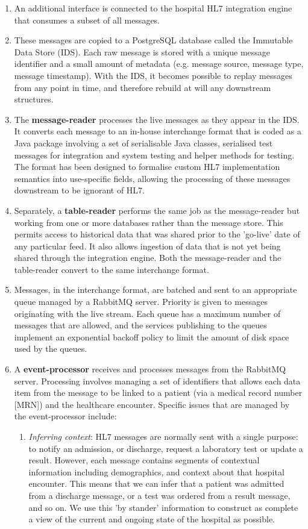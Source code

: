 \documentclass[pmlr,twocolumn,10pt]{jmlr} %
\begin{document}
\begin{enumerate}
    \item An additional interface is connected to the hospital HL7 integration engine that consumes a subset of all messages.
    \item These messages are copied to a PostgreSQL database called the Immutable Data Store (IDS). Each raw message is stored with a unique message identifier and a small amount of metadata (e.g. message source, message type, message timestamp). With the IDS, it becomes possible to replay messages from any point in time, and therefore rebuild at will any downstream structures.
    \item The \textbf{message-reader} processes the live messages as they appear in the IDS. It converts each message to an in-house interchange format that is coded as a Java package involving a set of serialisable Java classes, serialised test messages for integration and system testing and helper methods for testing. The format has been designed to formalise custom HL7 implementation semantics into use-specific fields, allowing the processing of these messages downstream to be ignorant of HL7. 
    \item Separately, a \textbf{table-reader} performs the same job as the message-reader but working from one or more databases rather than the message store. This permits access to historical data that was shared prior to the 'go-live' date of any particular feed. It also allows ingestion of data that is not yet being shared through the integration engine. Both the message-reader and the table-reader convert to the same interchange format.
    \item Messages, in the interchange format, are batched and sent to an appropriate queue managed by a RabbitMQ server. Priority is given to messages originating with the live stream. Each queue has a maximum number of messages that are allowed, and the services publishing to the queues implement an exponential backoff policy to limit the amount of disk space used by the queues.
    \item A \textbf{event-processor} receives and processes messages from the RabbitMQ server. Processing involves managing a set of identifiers that allows each data item from the message to be linked to a patient (via a medical record number [MRN]) and the healthcare encounter. Specific issues that are managed by the event-processor include:
    \begin{enumerate}
        \item \textit{Inferring context}: HL7 messages are normally sent with a single purpose: to notify an admission, or discharge, request a laboratory test or update a result. However, each message contains segments of contextual information including demographics, and context about that hospital encounter. This means that we can infer that a patient was admitted from a discharge message, or a test was ordered from a result message, and so on. We use this 'by stander' information to construct as complete a view of the current and ongoing state of the hospital as possible.

\end{enumerate}
\end{enumerate}
\end{document}

